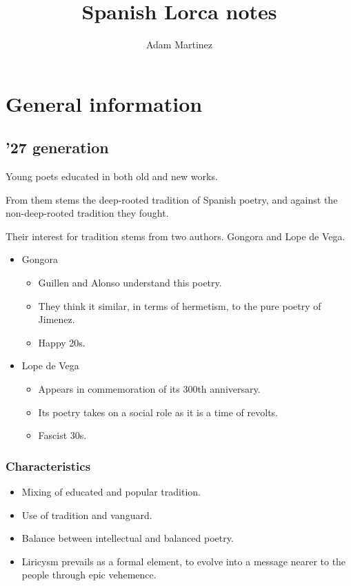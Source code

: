 \documentclass{article}
\title{Spanish Lorca notes}
\author{Adam Martinez}
\date{}
\begin{document}
\maketitle

\section*{General information}

\subsection*{'27 generation}

Young poets educated in both old and new works.

From them stems the deep-rooted tradition of Spanish poetry, and against the
non-deep-rooted tradition they fought.

Their interest for tradition stems from two authors. Gongora and Lope de Vega.

\begin{itemize}
    \item Gongora
    \begin{itemize}
        \item Guillen and Alonso understand this poetry.
        \item They think it similar, in terms of hermetism, to the pure poetry
        of Jimenez.
        \item Happy 20s.
    \end{itemize}
    \item Lope de Vega
    \begin{itemize}
        \item Appears in commemoration of its 300th anniversary.
        \item Its poetry takes on a social role as it is a time of revolts.
        \item Fascist 30s.
    \end{itemize}
\end{itemize}

\subsubsection*{Characteristics}

\begin{itemize}
    \item Mixing of educated and popular tradition.
    \item Use of tradition and vanguard.
    \item Balance between intellectual and balanced poetry.
    \item Liricysm prevails as a formal element, to evolve into a message nearer
    to the people through epic vehemence.
\end{itemize}
\end{document}
